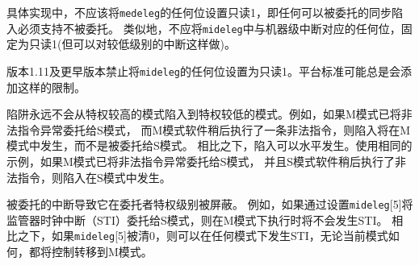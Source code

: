 具体实现中，不应该将{\tt medeleg}的任何位设置只读1，即任何可以被委托的同步陷入必须支持不被委托。
类似地，不应将{\tt mideleg}中与机器级中断对应的任何位，固定为只读1(但可以对较低级别的中断这样做)。

\iffalse
\begin{commentary}
Version 1.11 and earlier prohibited having any bits of {\tt mideleg}
be read-only one.
Platform standards may always add such restrictions.
\end{commentary}
\fi

\begin{commentary}
版本1.11及更早版本禁止将{\tt mideleg}的任何位设置为只读1。平台标准可能总是会添加这样的限制。
\end{commentary}

\iffalse
Traps never transition from a more-privileged mode to a less-privileged mode.
For example, if M-mode has delegated illegal instruction exceptions to S-mode, and
M-mode software later executes an illegal instruction, the trap is taken in
M-mode, rather than being delegated to S-mode.  By contrast, traps may be
taken horizontally.  Using the same example, if M-mode has delegated illegal
instruction exceptions to S-mode, and S-mode software later executes an illegal
instruction, the trap is taken in S-mode.

Delegated interrupts result in the interrupt being masked at the delegator
privilege level.  For example, if the supervisor timer interrupt (STI) is
delegated to S-mode by setting {\tt mideleg}[5], STIs will not be taken when
executing in M-mode.  By contrast, if {\tt mideleg}[5] is clear, STIs can
be taken in any mode and regardless of current mode will transfer control to
M-mode.
\fi

陷阱永远不会从特权较高的模式陷入到特权较低的模式。例如，如果M模式已将非法指令异常委托给S模式，
而M模式软件稍后执行了一条非法指令，则陷入将在M模式中发生，而不是被委托给S模式。
相比之下，陷入可以水平发生。使用相同的示例，如果M模式已将非法指令异常委托给S模式，
并且S模式软件稍后执行了非法指令，则陷入在S模式中发生。

被委托的中断导致它在委托者特权级别被屏蔽。
例如，如果通过设置{\tt mideleg}[5]将监管器时钟中断（STI）委托给S模式，则在M模式下执行时将不会发生STI。
相比之下，如果{\tt mideleg}[5]被清0，则可以在任何模式下发生STI，无论当前模式如何，都将控制转移到M模式。


